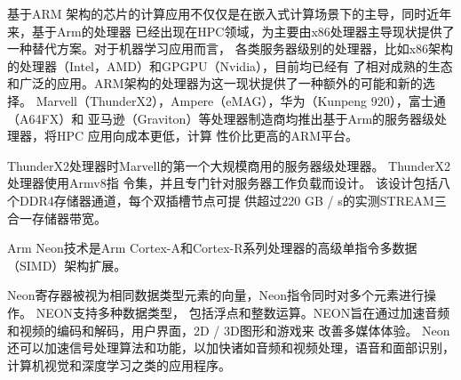 基于ARM 架构的芯片的计算应用不仅仅是在嵌入式计算场景下的主导，同时近年来，基于Arm的处理器
已经出现在HPC领域，为主要由x86处理器主导现状提供了一种替代方案。对于机器学习应用而言，
各类服务器级别的处理器，比如x86架构的处理器（Intel，AMD）和GPGPU（Nvidia），目前均已经有
了相对成熟的生态和广泛的应用。ARM架构的处理器为这一现状提供了一种额外的可能和新的选择。
Marvell（ThunderX2），Ampere（eMAG），华为（Kunpeng 920），富士通（A64FX）和
亚马逊（Graviton）等处理器制造商均推出基于Arm的服务器级处理器，将HPC 应用向成本更低，计算
性价比更高的ARM平台。

ThunderX2处理器时Marvell的第一个大规模商用的服务器级处理器。 ThunderX2处理器使用Armv8指
令集，并且专门针对服务器工作负载而设计。 该设计包括八个DDR4存储器通道，每个双插槽节点可提
供超过220 GB / s的实测STREAM三合一存储器带宽。

Arm Neon技术是Arm Cortex-A和Cortex-R系列处理器的高级单指令多数据（SIMD）架构扩展。

Neon寄存器被视为相同数据类型元素的向量，Neon指令同时对多个元素进行操作。 NEON支持多种数据类型，
包括浮点和整数运算。NEON旨在通过加速音频和视频的编码和解码，用户界面，2D / 3D图形和游戏来
改善多媒体体验。 Neon还可以加速信号处理算法和功能，以加快诸如音频和视频处理，语音和面部识别，
计算机视觉和深度学习之类的应用程序。
